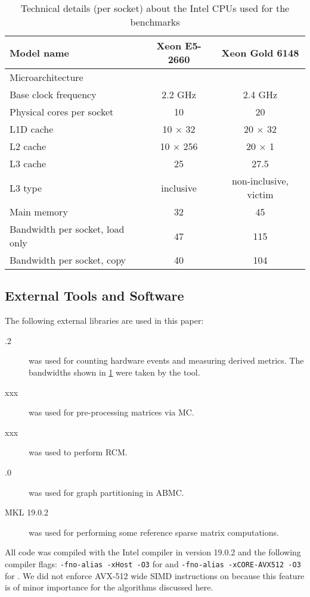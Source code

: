 \begin{table}[tbp]
	\footnotesize
	\caption{Technical details (per socket) about the Intel CPUs used for the benchmarks}\label{tab:test_bed}
	\begin{center}
		\begin{tabular}{l|cc}
			{Model name} & {Xeon\textsuperscript{\textregistered} E5-2660} & {Xeon\textsuperscript{\textregistered} Gold 6148} \\\midrule
			{Microarchitecture} & {\IVB} & {\SKX} \\\midrule
			{Base clock frequency} & {2.2 GHz} & {2.4 GHz}\\
			{Physical cores per socket} & {10} & {20} \\
			{L1D cache} & {10 $\times$ 32 \KiB} & {20 $\times$ 32 \KiB}\\
			{L2 cache} & {10 $\times$ 256 \KiB} & {20 $\times$ 1 \MiB} \\
			{L3 cache} & {25 \MiB} & {27.5 \MiB}\\
			{L3 type} & {inclusive} & {non-inclusive, victim}\\
			{Main memory} & {32 \GiB} & {45 \GiB}\\
			{Bandwidth per socket, load only} & {47 \GBS} & {115 \GBS}\\ %
			{Bandwidth per socket, copy} & {40 \GBS} & {104 \GBS}\\
		\end{tabular}
	\end{center}
\end{table} 


\subsection{External Tools and Software}
The following external libraries are used in this paper:
\begin{description}
	\item[.2] \cite{LIKWID}  \likwidPerfctr was used for counting hardware events and measuring derived metrics. The bandwidths shown in \cref{tab:test_bed} were taken by the  \likwidBench tool.
	\item[\COLPACK xxx] \cite{COLPACK} was used for pre-processing matrices via \acrshort{MC}.
	\item[\SPMP xxx] \cite{SpMP} was used to perform \acrshort{RCM}.
	\item[.0] \cite{METIS} was used for graph partitioning in \acrshort{ABMC}.
	\item[\acrshort{MKL} 19.0.2] \cite{MKL} was used for performing some reference sparse matrix computations.
\end{description}
All code was compiled with the Intel compiler in version 19.0.2 and the following compiler flags: {\tt -fno-alias -xHost -O3} for \IVB and {\tt -fno-alias -xCORE-AVX512 -O3} for \SKX. We did not enforce AVX-512 wide SIMD instructions on \SKX because this feature is of minor importance for the algorithms discussed here.

